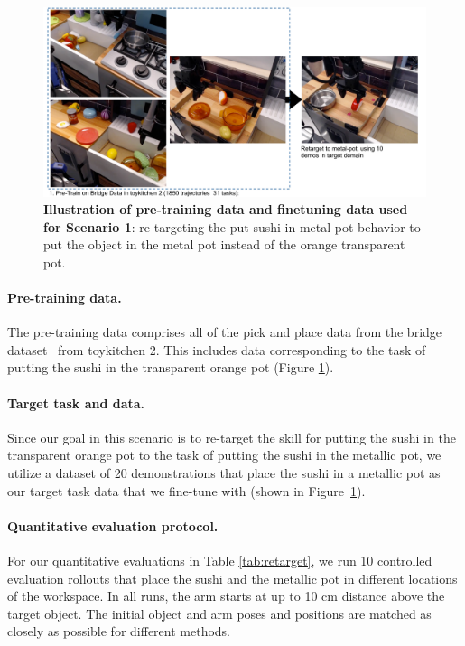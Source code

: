\documentclass[../thesis.tex]{subfiles}
\begin{document}
\begin{figure}
\centering
  \includegraphics[width=0.83\linewidth]{chapters/ptr/scenario1_overview.pdf}
  \caption{\footnotesize \textbf{Illustration of pre-training data and finetuning data used for Scenario 1}: re-targeting the put sushi in metal-pot behavior to put the object in the metal pot instead of the orange transparent pot.}
  \label{fig:retargeting_setup}
\end{figure}


\paragraph{Pre-training data.} The pre-training data comprises all of the pick and place data from the bridge dataset~\citep{ebert2021bridge} from toykitchen 2. This includes data corresponding to the task of putting the sushi in the transparent orange pot (Figure \ref{fig:retargeting_setup}).  

\paragraph{Target task and data.} Since our goal in this scenario is to re-target the skill for putting the sushi in the transparent orange pot to the task of putting the sushi in the metallic pot, we utilize a dataset of 20 demonstrations that place the sushi in a metallic pot as our target task data that we fine-tune with (shown in Figure~\ref{fig:retargeting_setup}). 

\paragraph{Quantitative evaluation protocol.} For our quantitative evaluations in Table \ref{tab:retarget}, we run 10 controlled evaluation rollouts that place the sushi and the metallic pot in different locations of the workspace. In all runs, the arm starts at up to 10 cm distance above the target object. The initial object and arm poses and positions are matched as closely as possible for different methods.
\end{document}
